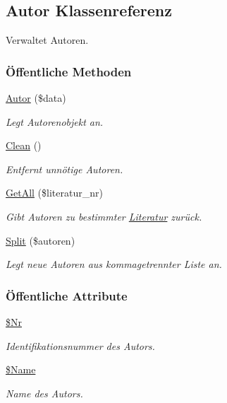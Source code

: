 \hypertarget{classAutor}{
\subsection{Autor Klassenreferenz}
\label{classAutor}
}
Verwaltet Autoren.  


\subsubsection*{\"{O}ffentliche Methoden}
\begin{CompactItemize}
\item 
\hyperlink{classAutor_2302710dd8970853f5d49c62d4586e8f}{Autor} (\$data)
\begin{CompactList}\small\item\em Legt Autorenobjekt an. \item\end{CompactList}\item 
\hyperlink{classAutor_77b27af7e471abe5a404fc92c7319921}{Clean} ()
\begin{CompactList}\small\item\em Entfernt unnötige Autoren. \item\end{CompactList}\item 
\hyperlink{classAutor_79cd90084cab240919a5daecf39156a7}{Get\-All} (\$literatur\_\-nr)
\begin{CompactList}\small\item\em Gibt Autoren zu bestimmter \hyperlink{classLiteratur}{Literatur} zurück. \item\end{CompactList}\item 
\hyperlink{classAutor_2ba5418b6622f414fa8a054e6c2a2db8}{Split} (\$autoren)
\begin{CompactList}\small\item\em Legt neue Autoren aus kommagetrennter Liste an. \item\end{CompactList}\end{CompactItemize}
\subsubsection*{\"{O}ffentliche Attribute}
\begin{CompactItemize}
\item 
\hyperlink{classAutor_23e64634d5dc31b41b7ee9c49b9ea6b9}{\$Nr}
\begin{CompactList}\small\item\em Identifikationsnummer des Autors. \item\end{CompactList}\item 
\hyperlink{classAutor_8602b5705cef83e7c16f4040f9add56d}{\$Name}
\begin{CompactList}\small\item\em Name des Autors. \item\end{CompactList}\end{CompactItemize}


